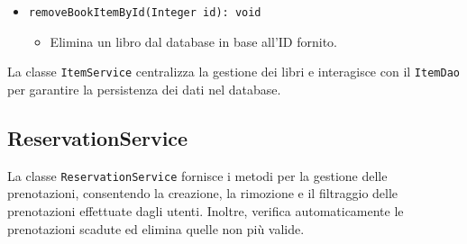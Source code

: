 \documentclass[twoside,openright,titlepage,fleqn,headinclude,12pt,a4paper,BCOR=5mm,footinclude]{scrbook}
\begin{document}
\begin{itemize}
    \item \texttt{removeBookItemById(Integer id): void}  
    \begin{itemize}  
        \item Elimina un libro dal database in base all'ID fornito.  
    \end{itemize}  
\end{itemize}  

La classe \texttt{ItemService} centralizza la gestione dei libri e interagisce con il \texttt{ItemDao} per garantire la persistenza dei dati nel database.

\subsection{ReservationService}
La classe \texttt{ReservationService} fornisce i metodi per la gestione delle prenotazioni, consentendo la creazione, la rimozione e il filtraggio delle prenotazioni effettuate dagli utenti. Inoltre, verifica automaticamente le prenotazioni scadute ed elimina quelle non più valide.
\end{document}
